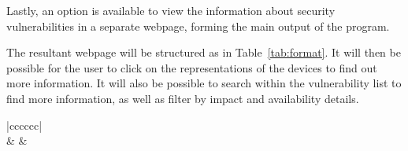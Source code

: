 Lastly, an option is available to view the information about security
vulnerabilities in a separate webpage, forming the main output of the
program.

The resultant webpage will be structured as in Table~\ref{tab:format}.  It
will then be possible for the user to click on the representations of the
devices to find out more information.  It will also be possible to search
within the vulnerability list to find more information, as well as filter by
impact and availability details.

\begin{table}[h!t] \centering \begin{tabular}{|cccccc|} \toprule
                                                                                                                                                                                                                                          \\
    \midrule {} &  &  \\
    \midrule
                                                                                                                                                                                                    \\
    \midrule
                                                                                                                                                                                      \\
    \midrule
                                                      \\
    \midrule
                                                                                                                                                                                                                \\
    \bottomrule \end{tabular} \caption{Format of presented data found in e-mail
    header}\label{tab:format} \end{table}

